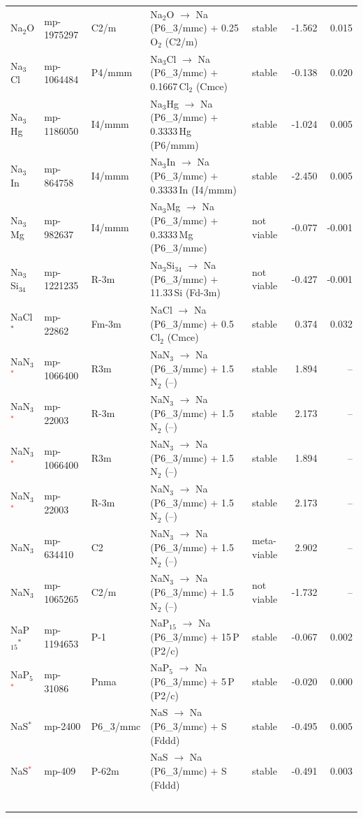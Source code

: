 \begin{longtable}{@{}ll l@{\hspace{4pt}} p{4.6cm} l@{\hspace{4pt}} rr@{}}
Na$_{2}$O & mp-1975297 & C2/m & Na$_{2}$O $\to$ Na (P6\_3/mmc) $+$ 0.25\,O$_{2}$ (C2/m) & stable & -1.562 & 0.015 \\
Na$_{3}$Cl & mp-1064484 & P4/mmm & Na$_{3}$Cl $\to$ Na (P6\_3/mmc) $+$ 0.1667\,Cl$_{2}$ (Cmce) & stable & -0.138 & 0.020 \\
Na$_{3}$Hg & mp-1186050 & I4/mmm & Na$_{3}$Hg $\to$ Na (P6\_3/mmc) $+$ 0.3333\,Hg (P6/mmm) & stable & -1.024 & 0.005 \\
Na$_{3}$In & mp-864758 & I4/mmm & Na$_{3}$In $\to$ Na (P6\_3/mmc) $+$ 0.3333\,In (I4/mmm) & stable & -2.450 & 0.005 \\
Na$_{3}$Mg & mp-982637 & I4/mmm & Na$_{3}$Mg $\to$ Na (P6\_3/mmc) $+$ 0.3333\,Mg (P6\_3/mmc) & not viable & -0.077 & -0.001 \\
Na$_{3}$Si$_{34}$ & mp-1221235 & R-3m & Na$_{3}$Si$_{34}$ $\to$ Na (P6\_3/mmc) $+$ 11.33\,Si (Fd-3m) & not viable & -0.427 & -0.001 \\
NaCl$^*$ & mp-22862 & Fm-3m & NaCl $\to$ Na (P6\_3/mmc) $+$ 0.5\,Cl$_{2}$ (Cmce) & stable & 0.374 & 0.032 \\
NaN$_{3}$\textcolor{red}{$^*$} & mp-1066400 & R3m & NaN$_{3}$ $\to$ Na (P6\_3/mmc) $+$ 1.5\,N$_{2}$ (--) & stable & 1.894 & -- \\
NaN$_{3}$\textcolor{red}{$^*$} & mp-22003 & R-3m & NaN$_{3}$ $\to$ Na (P6\_3/mmc) $+$ 1.5\,N$_{2}$ (--) & stable & 2.173 & -- \\
NaN$_{3}$\textcolor{red}{$^*$} & mp-1066400 & R3m & NaN$_{3}$ $\to$ Na (P6\_3/mmc) $+$ 1.5\,N$_{2}$ (--) & stable & 1.894 & -- \\
NaN$_{3}$\textcolor{red}{$^*$} & mp-22003 & R-3m & NaN$_{3}$ $\to$ Na (P6\_3/mmc) $+$ 1.5\,N$_{2}$ (--) & stable & 2.173 & -- \\
NaN$_{3}$ & mp-634410 & C2 & NaN$_{3}$ $\to$ Na (P6\_3/mmc) $+$ 1.5\,N$_{2}$ (--) & meta-viable & 2.902 & -- \\
NaN$_{3}$ & mp-1065265 & C2/m & NaN$_{3}$ $\to$ Na (P6\_3/mmc) $+$ 1.5\,N$_{2}$ (--) & not viable & -1.732 & -- \\
NaP$_{15}$$^*$ & mp-1194653 & P-1 & NaP$_{15}$ $\to$ Na (P6\_3/mmc) $+$ 15\,P (P2/c) & stable & -0.067 & 0.002 \\
NaP$_{5}$\textcolor{red}{$^*$} & mp-31086 & Pnma & NaP$_{5}$ $\to$ Na (P6\_3/mmc) $+$ 5\,P (P2/c) & stable & -0.020 & 0.000 \\
NaS$^*$ & mp-2400 & P6\_3/mmc & NaS $\to$ Na (P6\_3/mmc) $+$ S (Fddd) & stable & -0.495 & 0.005 \\
NaS\textcolor{red}{$^*$} & mp-409 & P-62m & NaS $\to$ Na (P6\_3/mmc) $+$ S (Fddd) & stable & -0.491 & 0.003 \\
$$
\end{longtable}
